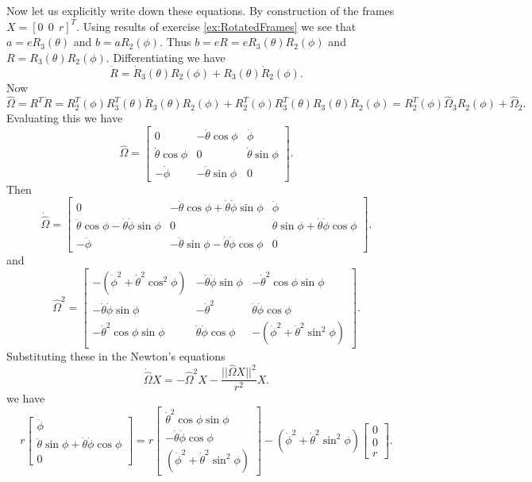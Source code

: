 \documentclass[graybox,envcountchap,sectrefs]{svmonoMuga}
\begin{document}
Now let us explicitly write down these equations. By construction of the frames $X=[0\:\: 0\:\: r]^T$. Using results of exercise \ref{ex:RotatedFrames} we see that $a=eR_3{(\theta)}$ 
and $b=aR_2{(\phi)}$. Thus
$b=eR=eR_3{(\theta)}R_2{(\phi)}$ and $R=R_3{(\theta)}R_2{(\phi)}$.
Differentiating we have
\[
\dot{R}=\dot{R}_3{(\theta)}R_2{(\phi)}+R_3{(\theta)}\dot{R}_2{(\phi)}.
\]
Now
\[
\widehat{\Omega}=R^T\dot{R}=R^T_2{(\phi)}R^T_3{(\theta)}\dot{R}_3{(\theta)}R_2{(\phi)}+R^T_2{(\phi)}R^T_3{(\theta)}R_3{(\theta)}\dot{R}_2{(\phi)}
=R^T_2{(\phi)}\widehat{\Omega}_3R_2{(\phi)}+\widehat{\Omega}_2.
\]
Evaluating this we have
\[
\widehat{\Omega}=\left[\begin{array}{ccc}
0 & -\dot{\theta}\cos{\phi} & \dot{\phi}\\
\dot{\theta}\cos{\phi} & 0 & \dot{\theta}\sin{\phi}\\
- \dot{\phi}& -\dot{\theta}\sin{\phi} & 0
\end{array}\right].
\]
Then
\[
\dot{\widehat{\Omega}}=\left[\begin{array}{ccc}
0 & -\ddot{\theta}\cos{\phi}+\dot{\theta}\dot{\phi}\sin{\phi} & \ddot{\phi}\\
\ddot{\theta}\cos{\phi}-\dot{\theta}\dot{\phi}\sin{\phi} & 0 & \ddot{\theta}\sin{\phi}+\dot{\theta}\dot{\phi}\cos{\phi}\\
- \ddot{\phi}& -\ddot{\theta}\sin{\phi}-\dot{\theta}\dot{\phi}\cos{\phi} & 0
\end{array}\right].
\]
and
\[
\widehat{\Omega}^2=\left[\begin{array}{ccc}
-(\dot{\phi}^2+\dot{\theta}^2\cos^2{\phi}) & -\dot{\theta}\dot{\phi}\sin{\phi} & -\dot{\theta}^2\cos{\phi}\sin{\phi}\\
 -\dot{\theta}\dot{\phi}\sin{\phi} & -\dot{\theta}^2 & \dot{\theta}\dot{\phi}\cos{\phi}\\
-\dot{\theta}^2\cos{\phi}\sin{\phi}&\dot{\theta}\dot{\phi}\cos{\phi} & -(\dot{\phi}^2+\dot{\theta}^2\sin^2{\phi})
\end{array}\right].
\]
Substituting these in the Newton's equations
\[
\dot{\widehat{\Omega}}X=-\widehat{\Omega}^2X-\frac{||\widehat{\Omega}X||^2}{r^2}X.
\]
we have
\[
r\left[\begin{array}{c}
 \ddot{\phi}\\
\ddot{\theta}\sin{\phi}+\dot{\theta}\dot{\phi}\cos{\phi}\\
0
\end{array}\right]=
r\left[\begin{array}{c}
\dot{\theta}^2\cos{\phi}\sin{\phi}\\
-\dot{\theta}\dot{\phi}\cos{\phi}\\
(\dot{\phi}^2+\dot{\theta}^2\sin^2{\phi})
\end{array}\right]-
(\dot{\phi}^2+\dot{\theta}^2\sin^2{\phi})\left[\begin{array}{c}
0\\
0\\
r
\end{array}\right].
\]
\end{document}
